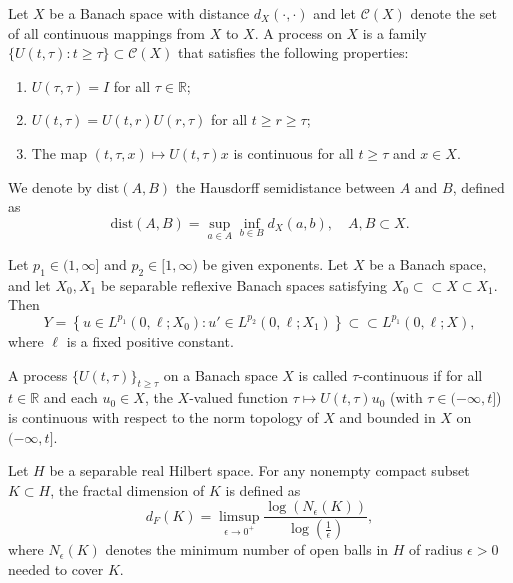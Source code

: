\documentclass[oneside,preprint,12pt,numbers,sort&compress]{elsarticle}
\begin{document}
\par Let $X$ be a Banach space with distance $d_{X}(\cdot,\cdot)$ and let $\mathscr{C}(X)$ denote the set of all continuous mappings from $X$ to $X$.  A process on $X$ is a family $\{ U(t,\tau) : t \geq \tau \} \subset \mathscr{C}(X)$ that satisfies the following properties:  
\begin{enumerate}  
    \item $U(\tau,\tau) = I$ for all $\tau \in \mathbb{R}$;
    \item $U(t,\tau) = U(t,r)U(r,\tau)$ for all $t \geq r \geq \tau$;
    \item The map $(t,\tau,x) \mapsto U(t,\tau)x$ is continuous for all $t \geq \tau$ and $x \in X$.  
\end{enumerate}   

\par We denote by $\text{dist}(A,B)$ the Hausdorff semidistance between $A$ and $B$, defined as
\[
\text{dist}(A,B)=\sup_{a\in A} \inf_{b\in B} d_{X}(a,b),\quad A,B\subset X.
\]

\begin{lemma}[\cite{MN1996,CV2002,MP2002}]\label{ALlem}
Let $ p_1 \in (1, \infty] $ and $ p_2 \in [1, \infty) $ be given exponents. Let $ X $ be a Banach space, and let $ X_0, X_1 $ be separable reflexive Banach spaces satisfying $ X_0 \subset\subset X \subset X_1 $. Then 
$$
Y = \left\{ u \in L^{p_1}(0, \ell; X_0) : u' \in L^{p_2}(0, \ell; X_1) \right\} \subset\subset L^{p_1}(0, \ell; X),
$$
where $ \ell $ is a fixed positive constant.
\end{lemma}

\begin{definition}
A process $\{U(t,\tau)\}_{t\geq \tau}$ on a Banach space $X$ is called $\tau$-continuous if for all $t \in \mathbb{R}$ and each $u_0 \in X$, the $X$-valued function $\tau \mapsto U(t,\tau)u_0$ (with $\tau \in (-\infty, t]$) is continuous with respect to the norm topology of $X$ and bounded in $X$ on $(-\infty, t]$.
\end{definition}

\begin{definition}\label{weishudingyi}
Let \(H\) be a separable real Hilbert space. For any nonempty compact subset \(K \subset H\), the fractal dimension of \(K\) is defined as
\[
d_F(K) = \limsup_{\epsilon \to 0^+} \frac{\log(N_\epsilon(K))}{\log\left(\frac{1}{\epsilon}\right)},
\]
where \(N_\epsilon(K)\) denotes the minimum number of open balls in \(H\) of radius \(\epsilon > 0\) needed to cover \(K\).
\end{definition}
\end{document}
